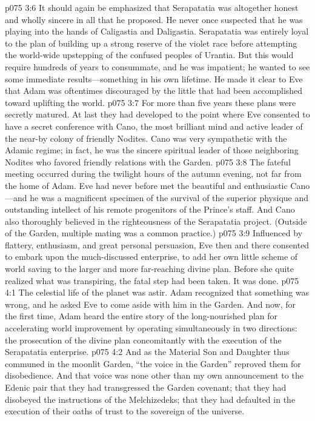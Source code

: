 \vs p075 3:6 It should again be emphasized that Serapatatia was altogether honest and wholly sincere in all that he proposed. He never once suspected that he was playing into the hands of Caligastia and Daligastia. Serapatatia was entirely loyal to the plan of building up a strong reserve of the violet race before attempting the world\hyp{}wide upstepping of the confused peoples of Urantia. But this would require hundreds of years to consummate, and he was impatient; he wanted to see some immediate results---something in his own lifetime. He made it clear to Eve that Adam was oftentimes discouraged by the little that had been accomplished toward uplifting the world.
\pc \vs p075 3:7 For more than five years these plans were secretly matured. At last they had developed to the point where Eve consented to have a secret conference with Cano, the most brilliant mind and active leader of the near\hyp{}by colony of friendly Nodites. Cano was very sympathetic with the Adamic regime; in fact, he was the sincere spiritual leader of those neighboring Nodites who favored friendly relations with the Garden.
\vs p075 3:8 The fateful meeting occurred during the twilight hours of the autumn evening, not far from the home of Adam. Eve had never before met the beautiful and enthusiastic Cano---and he was a magnificent specimen of the survival of the superior physique and outstanding intellect of his remote progenitors of the Prince’s staff. And Cano also thoroughly believed in the righteousness of the Serapatatia project. (Outside of the Garden, multiple mating was a common practice.)\plusone
\vs p075 3:9 Influenced by flattery, enthusiasm, and great personal persuasion, Eve then and there consented to embark upon the much\hyp{}discussed enterprise, to add her own little scheme of world saving to the larger and more far\hyp{}reaching divine plan. Before she quite realized what was transpiring, the fatal step had been taken. It was done.
\vs p075 4:1 The celestial life of the planet was astir. Adam recognized that something was wrong, and he asked Eve to come aside with him in the Garden. And now, for the first time, Adam heard the entire story of the long\hyp{}nourished plan for accelerating world improvement by operating simultaneously in two directions: the prosecution of the divine plan concomitantly with the execution of the Serapatatia enterprise.
\vs p075 4:2 And as the Material Son and Daughter thus communed in the moonlit Garden, “the voice in the Garden” reproved them for disobedience. And that voice was none other than my own announcement to the Edenic pair that they had transgressed the Garden covenant; that they had disobeyed the instructions of the Melchizedeks; that they had defaulted in the execution of their oaths of trust to the sovereign of the universe.

